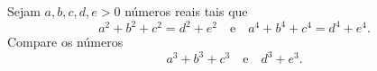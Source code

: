 Sejam \(a, b, c, d, e > 0\) números reais tais que
\[a^{2}+b^{2}+c^{2}=d^{2}+e^{2} \quad \text{e} \quad a^{4}+b^{4}+c^{4}=d^{4}+e^{4}.\]
Compare os números \[a^{3}+b^{3}+c^{3} \quad \text{e} \quad d^{3}+e^{3}.\]
